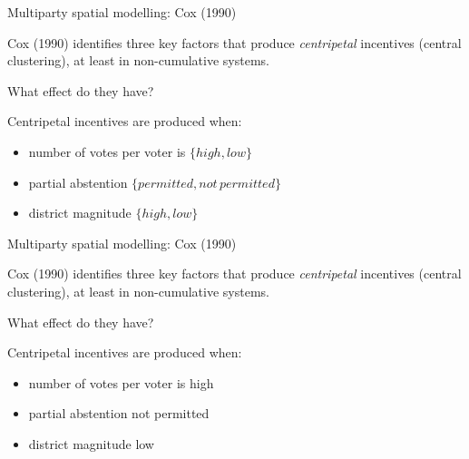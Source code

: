 \documentclass[11pt,aspectratio=169]{beamer}
\begin{document}
\begin{frame}{Multiparty spatial modelling: Cox (1990)}

Cox (1990) identifies \alert{three} key factors that produce \textit{centripetal} incentives (central clustering), at least in non-cumulative systems. 

\begin{tcolorbox}
What effect do they have?
\end{tcolorbox}

Centripetal incentives are produced when:
\pause 
\begin{itemize}
\item number of votes per voter is $\{ high, low \}$
\item partial abstention $\{ permitted, not \, permitted \}$
\item district magnitude $\{ high, low \}$
\end{itemize}

\end{frame}
\begin{frame}{Multiparty spatial modelling: Cox (1990)}

Cox (1990) identifies \alert{three} key factors that produce \textit{centripetal} incentives (central clustering), at least in non-cumulative systems. 

\begin{tcolorbox}
What effect do they have?
\end{tcolorbox}

Centripetal incentives are produced when:
\pause 
\begin{itemize}
\item number of votes per voter is \alert{high}
\item partial abstention \alert{ not permitted}
\item district magnitude \alert{low}
\end{itemize}

\end{frame}
\end{document}
